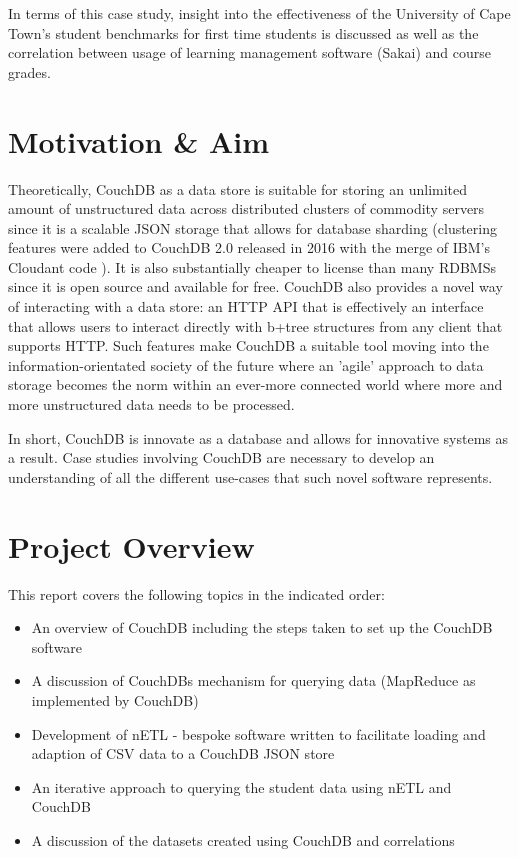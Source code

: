 In terms of this case study, insight into the effectiveness of the University of Cape Town's student benchmarks for first time students is discussed as well as the correlation between usage of learning management software (Sakai) and course grades.

\section{Motivation \& Aim}
Theoretically, CouchDB as a data store is suitable for storing an unlimited amount of unstructured data across distributed clusters of commodity servers since it is a scalable JSON storage that allows for database sharding (clustering features were added to CouchDB 2.0 released in 2016 with the merge of IBM's Cloudant code \cite{couchdb2.0}). It is also substantially cheaper to license than many RDBMSs since it is open source and available for free. CouchDB also provides a novel way of interacting with a data store: an HTTP API that is effectively an interface that allows users to interact directly with b+tree structures from any client that supports HTTP. Such features make CouchDB a suitable tool moving into the information-orientated society of the future where an 'agile' approach to data storage becomes the norm within an ever-more connected world where more and more unstructured data needs to be processed.

In short, CouchDB is innovate as a database and allows for innovative systems as a result. Case studies involving CouchDB are necessary to develop an understanding of all the different use-cases that such novel software represents.

\section{Project Overview}
This report covers the following topics in the indicated order:

\begin{itemize}
    \item An overview of CouchDB including the steps taken to set up the CouchDB software
    \item A discussion of CouchDBs mechanism for querying data (MapReduce as implemented by CouchDB)
    \item Development of nETL - bespoke software written to facilitate loading and adaption of CSV data to a CouchDB JSON store
    \item An iterative approach to querying the student data using nETL and CouchDB
    \item A discussion of the datasets created using CouchDB and correlations
\end{itemize}

